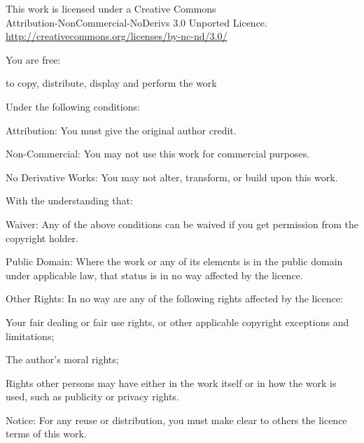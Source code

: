 
\vspace*{-2\onelineskip}
\enlargethispage{\onelineskip}

{\smaller\setlength{\parindent}{0pt}%
\raggedright\label{copyright-details}
\setlength{\parskip}{5pt}
{\centering

{\large\ccbyncnd}

This work is licensed under a Creative Commons\\
Attribution-NonCommercial-NoDerivs 3.0 Unported Licence.\\
\href{http://creativecommons.org/licenses/by-nc-nd/3.0/}{http://creativecommons.org/licenses/by-nc-nd/3.0/}

}

You are free:

\begin{packeditemize}
\item to copy, distribute, display and perform the work
\end{packeditemize}

Under the following conditions:

\begin{packeditemize}
\item Attribution: You must give the original author credit.
\item Non-Commercial: You may not use this work for commercial purposes.
\item No Derivative Works: You may not alter, transform, or build upon this work.
\end{packeditemize}

With the understanding that:

\begin{packeditemize}
\item Waiver: Any of the above conditions can be waived if you get permission from the copyright holder.
\item Public Domain: Where the work or any of its elements is in the public domain under applicable law, that status is in no way affected by the licence.
\item Other Rights: In no way are any of the following rights affected by the licence:
\begin{packeditemize}
\item Your fair dealing or fair use rights, or other applicable copyright exceptions and limitations;
\item The author's moral rights;
\item Rights other persons may have either in the work itself or in how the work is used, such as publicity or privacy rights.
\end{packeditemize}
\item Notice: For any reuse or distribution, you must make clear to others the licence terms of this work.
\end{packeditemize}

}
